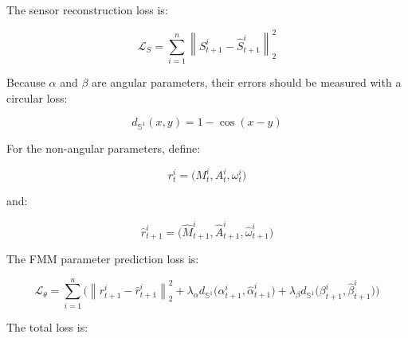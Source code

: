 \documentclass[a4paper]{article}
\begin{document}
        The sensor reconstruction loss is:
        
        \begin{equation}
            \mathcal{L}_{S}
            =
            \sum_{i=1}^{n}
            \left\lVert
                S_{t+1}^i
            -
                \hat{S}_{t+1}^i
            \right\rVert_2^2
        \end{equation}
        
        Because \(\alpha\) and \(\beta\) are angular parameters, their errors should be measured with a circular loss:
        
        \begin{equation}
            d_{\mathbb{S}^1}(x,y)
            =
            1
            -
            \cos(x-y)
        \end{equation}
        
        For the non-angular parameters, define:
        
        \begin{equation}
            r_t^i
            =
            \bigl(
            M_t^i,
            A_t^i,
            \omega_t^i
            \bigr)
        \end{equation}
        
        and:
        
        \begin{equation}
            \hat{r}_{t+1}^i
            =
            \bigl(
            \hat{M}_{t+1}^i,
            \hat{A}_{t+1}^i,
            \hat{\omega}_{t+1}^i
            \bigr)
        \end{equation}
        
        The FMM parameter prediction loss is:
        
        \begin{equation}
            \mathcal{L}_{\theta}
            =
            \sum_{i=1}^{n}
            \biggl(
            \left\lVert
                r_{t+1}^i
            -
                \hat{r}_{t+1}^i
            \right\rVert_2^2
            +
            \lambda_{\alpha}
            d_{\mathbb{S}^1}
            \bigl(
            \alpha_{t+1}^i,
            \hat{\alpha}_{t+1}^i
            )
            +
            \lambda_{\beta}
            d_{\mathbb{S}^1}
            \bigl(
            \beta_{t+1}^i,
            \hat{\beta}_{t+1}^i
            )
            \biggr)
        \end{equation}
        
        The total loss is:
        
\end{document}
